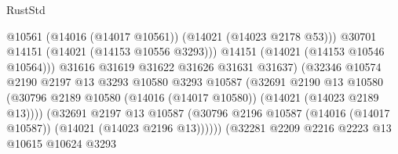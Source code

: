 \begin{lexlean}{RustStd}
\begin{coremodule}
                                                @10561
                                                (@14016 (@14017 @10561))
                                                (@14021 (@14023 @2178 @53)))
                                              @30701
                                              @14151
                                              (@14021 (@14153 @10556 @3293)))
                                            @14151
                                            (@14021 (@14153 @10546 @10564)))
                                          @31616
                                          @31619
                                          @31622
                                          @31626
                                          @31631
                                          @31637)
                                        (@32346
                                          @10574
                                          @2190
                                          @2197
                                          @13
                                          @3293
                                          @10580
                                          @3293
                                          @10587
                                          (@32691
                                            @2190
                                            @13
                                            @10580
                                            (@30796
                                              @2189
                                              @10580
                                              (@14016 (@14017 @10580))
                                              (@14021 (@14023 @2189 @13))))
                                          (@32691
                                            @2197
                                            @13
                                            @10587
                                            (@30796
                                              @2196
                                              @10587
                                              (@14016 (@14017 @10587))
                                              (@14021 (@14023 @2196 @13))))))
                                      (@32281
                                        @2209
                                        @2216
                                        @2223
                                        @13
                                        @10615
                                        @10624
                                        @3293

\end{coremodule}
\end{lexlean}
